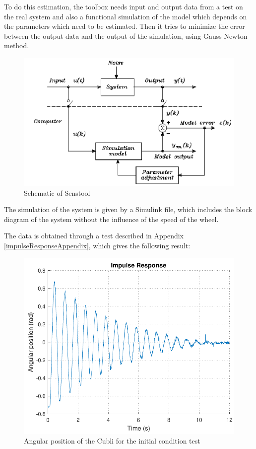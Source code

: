 To do this estimation, the toolbox needs input and output data from a test on the real system and also a functional simulation of the model which depends on the parameters which need to be estimated. Then it tries to minimize the error between the output data and the output of the simulation, using Gauss-Newton method.

\begin{figure}[H]
	\centering
	\includegraphics[scale=0.4]{figures/SensToolSchema}
	\caption{Schematic of Senstool}
	\label{SensToolSchema}
\end{figure}
The simulation of the system is given by a Simulink file, which includes the block diagram of the system without the influence of the speed of the wheel.

The data is obtained through a test described in Appendix \ref{impulseResponseAppendix}, which gives the following result:

\begin{figure}[H]
	\centering
	\includegraphics[scale=0.6]{figures/ImpRad}
	\caption{Angular position of the Cubli for the initial condition test}
	\label{cubliInitCondTest}
\end{figure}

